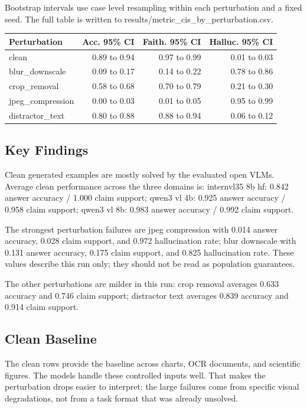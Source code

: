 \documentclass{article}
\begin{document}
Bootstrap intervals use case level resampling within each perturbation and a fixed seed. The full table is written to results/metric\_cis\_by\_perturbation.csv.

\begin{center}
\begin{tabular}{lrrr}
\hline
\textbf{Perturbation} & \textbf{Acc. 95\% CI} & \textbf{Faith. 95\% CI} & \textbf{Halluc. 95\% CI} \\
\hline
clean & 0.89 to 0.94 & 0.97 to 0.99 & 0.01 to 0.03 \\
blur\_downscale & 0.09 to 0.17 & 0.14 to 0.22 & 0.78 to 0.86 \\
crop\_removal & 0.58 to 0.68 & 0.70 to 0.79 & 0.21 to 0.30 \\
jpeg\_compression & 0.00 to 0.03 & 0.01 to 0.05 & 0.95 to 0.99 \\
distractor\_text & 0.80 to 0.88 & 0.88 to 0.94 & 0.06 to 0.12 \\
\hline
\end{tabular}
\end{center}

\subsection{Key Findings}

Clean generated examples are mostly solved by the evaluated open VLMs. Average clean performance across the three domains is: internvl35 8b hf: 0.842 answer accuracy / 1.000 claim support; qwen3 vl 4b: 0.925 answer accuracy / 0.958 claim support; qwen3 vl 8b: 0.983 answer accuracy / 0.992 claim support.

The strongest perturbation failures are jpeg compression with 0.014 answer accuracy, 0.028 claim support, and 0.972 hallucination rate; blur downscale with 0.131 answer accuracy, 0.175 claim support, and 0.825 hallucination rate. These values describe this run only; they should not be read as population guarantees.

The other perturbations are milder in this run: crop removal averages 0.633 accuracy and 0.746 claim support; distractor text averages 0.839 accuracy and 0.914 claim support.

\subsection{Clean Baseline}

The clean rows provide the baseline across charts, OCR documents, and scientific figures. The models handle these controlled inputs well. That makes the perturbation drops easier to interpret: the large failures come from specific visual degradations, not from a task format that was already unsolved.
\end{document}
